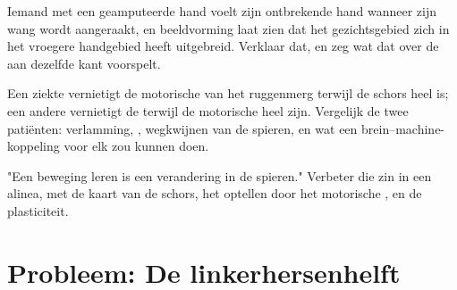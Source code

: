 \begin{exercise}[$\star\star\star$]\label{exo:g12:brain-and-movement:13}
Iemand met een geamputeerde hand voelt zijn ontbrekende hand wanneer zijn
wang wordt aangeraakt, en beeldvorming laat zien dat het gezichtsgebied
zich in het vroegere handgebied heeft uitgebreid. Verklaar dat, en zeg wat
dat over de  aan dezelfde kant voorspelt.
\end{exercise}

\begin{exercise}[$\star\star\star$]\label{exo:g12:brain-and-movement:14}
Een ziekte vernietigt de motorische  van het ruggenmerg terwijl de
schors heel is; een andere vernietigt de  terwijl de
motorische  heel zijn. Vergelijk de twee patiënten: verlamming,
, wegkwijnen van de spieren, en wat een brein--machine-koppeling
voor elk zou kunnen doen.
\end{exercise}

\begin{exercise}[$\star\star\star$]\label{exo:g12:brain-and-movement:15}
"Een beweging leren is een verandering in de spieren." Verbeter die zin in
een alinea, met de kaart van de schors, het optellen door het motorische
, en de plasticiteit.
\end{exercise}

\section{Probleem: De linkerhersenhelft}

